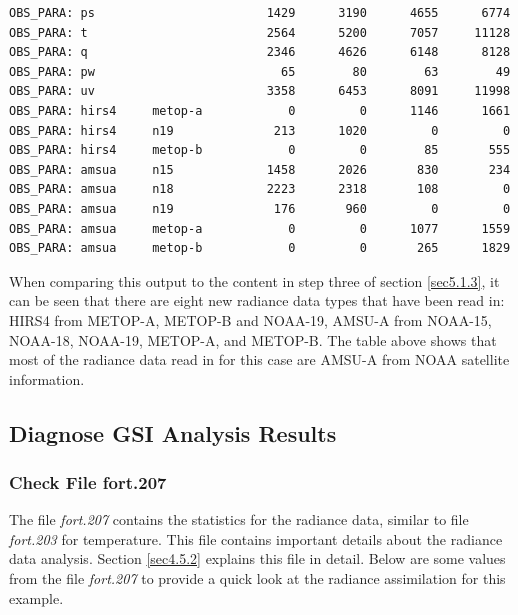 \begin{scriptsize}
\begin{verbatim}
OBS_PARA: ps                        1429      3190      4655      6774
OBS_PARA: t                         2564      5200      7057     11128
OBS_PARA: q                         2346      4626      6148      8128
OBS_PARA: pw                          65        80        63        49
OBS_PARA: uv                        3358      6453      8091     11998
OBS_PARA: hirs4     metop-a            0         0      1146      1661
OBS_PARA: hirs4     n19              213      1020         0         0
OBS_PARA: hirs4     metop-b            0         0        85       555
OBS_PARA: amsua     n15             1458      2026       830       234
OBS_PARA: amsua     n18             2223      2318       108         0
OBS_PARA: amsua     n19              176       960         0         0
OBS_PARA: amsua     metop-a            0         0      1077      1559
OBS_PARA: amsua     metop-b            0         0       265      1829
\end{verbatim}
\end{scriptsize}


When comparing this output to the content in step three of section \ref{sec5.1.3}, it can be seen that there are eight new radiance data types that have been read in: HIRS4 from METOP-A, METOP-B and NOAA-19, AMSU-A from NOAA-15, NOAA-18, NOAA-19, METOP-A, and METOP-B.  The table above shows that most of the radiance data read in for this case are AMSU-A from NOAA satellite information.

\subsection{Diagnose GSI Analysis Results}

\subsubsection{Check File fort.207}

The file \textit{fort.207} contains the statistics for the radiance data, similar to file \textit{fort.203} for temperature.  This file contains important details about the radiance data analysis.  Section \ref{sec4.5.2} explains this file in detail.  Below are some values from the file \textit{fort.207} to provide a quick look at the radiance assimilation for this example. 

